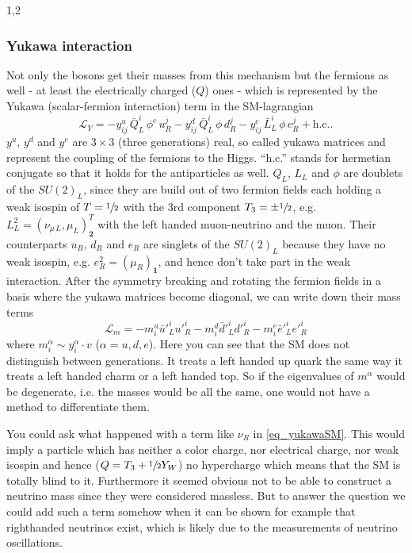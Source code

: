 \documentclass[11pt,a4paper,twoside]{article}
\begin{document}
\begin{spacing}{1,2}
\subsubsection*{Yukawa interaction}
Not only the bosons get their masses from this mechanism but the fermions as well - at least the electrically charged ($Q$) ones - which is represented by the
Yukawa (scalar-fermion interaction) term in the SM-lagrangian
\begin{equation}
 \mathcal{L}_{Y} = - y^u_{ij}\, \bar Q^i_L \, \phi^c\, u^j_R - y^d_{ij}\, \bar Q^i_L\, \phi\, d^j_R - y^e_{ij}\, \bar L^i_L\, \phi\, e^j_R + \text{h.c.}.
 \label{eq_yukawaSM}
\end{equation}
\noindent
$y^u$, $y^d$ and $y^e$ are $3\times 3$ (three generations) real, so called yukawa matrices and represent the 
coupling of the fermions to the Higgs. ``h.c.'' stands for hermetian conjugate so that it holds for the antiparticles as well. 
$Q_L$, $L_L$ and $\phi$ are doublets of the $SU(2)_L$, since they are build out of two fermion fields each holding a 
weak isospin of $T=\sfrac12$ with the 3rd component $T_3 = \pm\sfrac12$, e.g. $L^2_L = (\nu_{\mu\, L}, \mu_L)^T_{\textbf{2}}$ with the left handed muon-neutrino and the muon. 
Their counterparts $u_R$, $d_R$ and $e_R$ are singlets of the $SU(2)_L$ because they have no weak isospin, e.g. $e^2_R = (\mu_R)_{\textbf{1}}$, and hence don't take part
in the weak interaction. After 
the symmetry breaking and rotating the fermion fields in a basis where the yukawa matrices become diagonal, we can write down their mass terms 
\begin{equation}
 \mathcal{L}_m = -m^u_i \bar u'^i_L u'^i_R -m^d_i \bar d'^i_L d'^i_R -m^e_i \bar e'^i_L e'^i_R 
 \label{eq_massSM}
\end{equation}
\noindent
where $m^\alpha_i \sim y^\alpha_i \cdot v$ ($\alpha = u,d,e$). Here you can see that the SM does not distinguish between generations. 
It treats a left handed up quark the same way it treats a left handed charm or a left handed top. So if the eigenvalues of $m^\alpha$ would be degenerate, i.e. the masses would
be all the same, one would not have a method to differentiate them. 

\vspace{-0.3cm}
You could ask
what happened with a term like $\nu_R$ in \eqref{eq_yukawaSM}. This would imply a particle which has neither a color charge, nor electrical charge, nor 
weak isospin and hence ($Q = T_3 + \sfrac12 Y_W$) no hypercharge which means that the SM is totally blind to it. Furthermore it seemed obvious not to be
able to construct a neutrino mass since they were considered massless. But to answer the question we could add 
such a term somehow when it can be shown for example that righthanded neutrinos exist, which is likely due to the measurements of neutrino oscillations.
\vspace{1cm}

\end{spacing}
\end{document}
